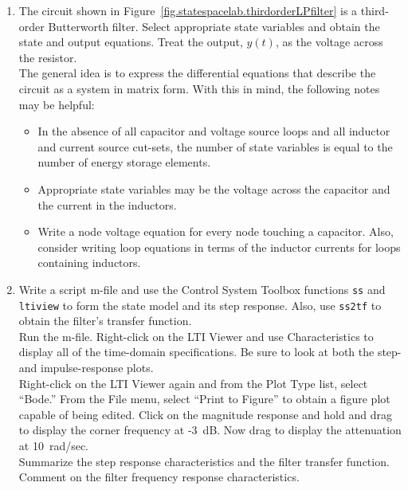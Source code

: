 \begin{enumerate}
\item The circuit shown in Figure~\ref{fig.statespacelab.thirdorderLPfilter}
    is a third-order Butterworth filter.  Select appropriate state variables and obtain the state and output equations.  Treat the output, $y(t)$, as the voltage across the resistor.\\
    The general idea is to express the differential equations that describe the circuit as a system in matrix form.  With this in mind, the following notes may be helpful:
        \begin{itemize}
        \item In the absence of all capacitor and voltage source loops and all
            inductor and current source cut-sets, the number of state variables is equal to the number of energy storage elements.
        \item Appropriate state variables may be the voltage across the
            capacitor and the current in the inductors.
        \item Write a node voltage equation for every node touching a
            capacitor.  Also, consider writing loop equations in terms of the inductor currents for loops containing inductors.
        \end{itemize}
\item Write a script m-file and use the Control System Toolbox functions
    \verb=ss= and \verb=ltiview= to form the state model and its step response.  Also, use \verb=ss2tf= to obtain the filter's transfer function.\\
    Run the m-file.  Right-click on the LTI Viewer and use Characteristics to display all of the time-domain specifications.  Be sure to look at both the step- and impulse-response plots.  \\
    Right-click on the LTI Viewer again and from the Plot Type list, select ``Bode.''  From the File menu, select ``Print to Figure'' to obtain a figure plot capable of being edited.  Click on the magnitude response and hold and drag to display the corner frequency at -3~dB.  Now drag to display the attenuation at 10~rad/sec.\\
    Summarize the step response characteristics and the filter transfer function.  Comment on the filter frequency response characteristics.
\end{enumerate}

